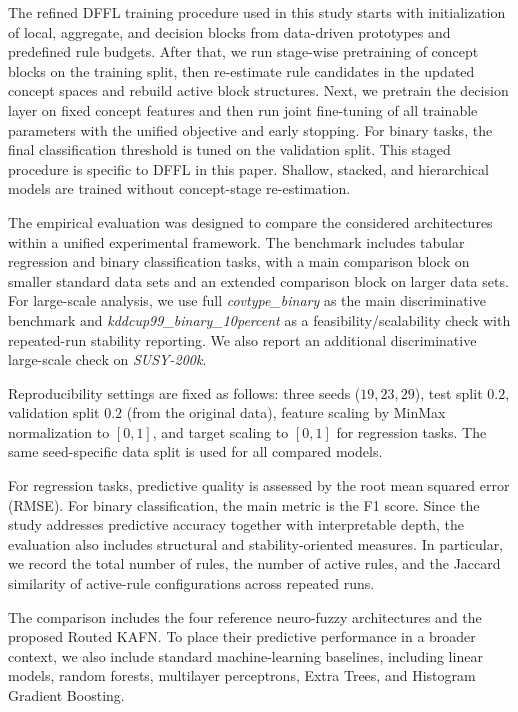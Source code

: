\documentclass[runningheads]{llncs}
\begin{document}
The refined DFFL training procedure used in this study starts with initialization of local, aggregate, and decision blocks from data-driven prototypes and predefined rule budgets. After that, we run stage-wise pretraining of concept blocks on the training split, then re-estimate rule candidates in the updated concept spaces and rebuild active block structures. Next, we pretrain the decision layer on fixed concept features and then run joint fine-tuning of all trainable parameters with the unified objective and early stopping. For binary tasks, the final classification threshold is tuned on the validation split.
This staged procedure is specific to DFFL in this paper. Shallow, stacked, and hierarchical models are trained without concept-stage re-estimation.

The empirical evaluation was designed to compare the considered architectures within a unified experimental framework. The benchmark includes tabular regression and binary classification tasks, with a main comparison block on smaller standard data sets and an extended comparison block on larger data sets. For large-scale analysis, we use full \textit{covtype\_binary} as the main discriminative benchmark and \textit{kddcup99\_binary\_10percent} as a feasibility/scalability check with repeated-run stability reporting. We also report an additional discriminative large-scale check on \textit{SUSY-200k}.

Reproducibility settings are fixed as follows: three seeds ($19,23,29$), test split $0.2$, validation split $0.2$ (from the original data), feature scaling by MinMax normalization to $[0,1]$, and target scaling to $[0,1]$ for regression tasks. The same seed-specific data split is used for all compared models.

For regression tasks, predictive quality is assessed by the root mean squared error (RMSE). For binary classification, the main metric is the F1 score. Since the study addresses predictive accuracy together with interpretable depth, the evaluation also includes structural and stability-oriented measures. In particular, we record the total number of rules, the number of active rules, and the Jaccard similarity of active-rule configurations across repeated runs.

The comparison includes the four reference neuro-fuzzy architectures and the proposed Routed KAFN. To place their predictive performance in a broader context, we also include standard machine-learning baselines, including linear models, random forests, multilayer perceptrons, Extra Trees, and Histogram Gradient Boosting.
\end{document}
